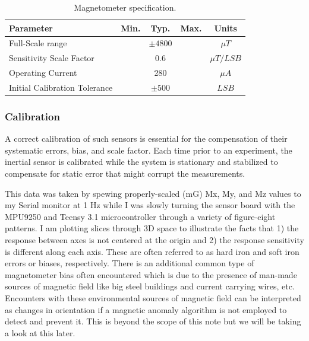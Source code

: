 \begin{table}[H]
    \begin{center}
        \begin{tabular}[t]{lcccc}
            \hline
            Parameter                     & Min. & Typ.       & Max. & Units        \\
            \hline
            Full-Scale range              &      & $\pm 4800$ &      & $\mu T$      \\
            Sensitivity Scale Factor      &      & 0.6        &      & $\mu T/ LSB$ \\
            Operating Current             &      & 280        &      & $\mu A$      \\
            Initial Calibration Tolerance &      & $\pm 500$  &      & $LSB$        \\
            \hline
        \end{tabular}
        \caption{Magnetometer specification. }
        \label{tab:magnetometer_multiplication}
    \end{center}
\end{table}

\subsubsection{Calibration}

A correct calibration of such sensors is essential for the compensation of their systematic errors, bias, and scale factor. Each time prior to an experiment, the inertial sensor is calibrated while the system is stationary and stabilized to compensate for static error that might corrupt the measurements.

This data was taken by spewing properly-scaled (mG) Mx, My, and Mz values to my Serial monitor at 1 Hz while I was slowly turning the sensor board with the MPU9250 and Teensy 3.1 microcontroller through a variety of figure-eight patterns. I am plotting slices through 3D space to illustrate the facts that 1) the response between axes is not centered at the origin and 2) the response sensitivity is different along each axis. These are often referred to as hard iron and soft iron errors or biases, respectively. There is an additional common type of magnetometer bias often encountered which is due to the presence of man-made sources of magnetic field like big steel buildings and current carrying wires, etc. Encounters with these environmental sources of magnetic field can be interpreted as changes in orientation if a magnetic anomaly algorithm is not employed to detect and prevent it. This is beyond the scope of this note but we will be taking a look at this later.


